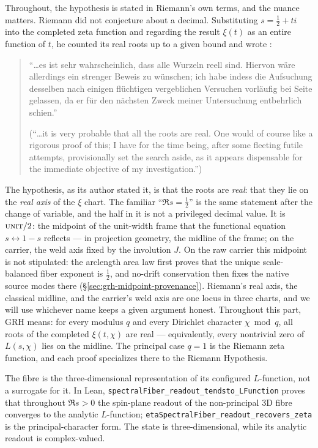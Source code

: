 Throughout, the hypothesis is stated in Riemann's own terms, and the nuance
matters. Riemann did not conjecture about a decimal. Substituting
\(s=\tfrac12+ti\) into the completed zeta function and regarding the result
\(\xi(t)\) as an entire function of \(t\), he counted its real roots up to a
given bound and wrote \cite{Riemann1859}:
\begin{quote}
``\ldots es ist sehr wahrscheinlich, dass alle Wurzeln reell sind. Hiervon
w\"are allerdings ein strenger Beweis zu w\"unschen; ich habe indess die
Aufsuchung desselben nach einigen fl\"uchtigen vergeblichen Versuchen
vorl\"aufig bei Seite gelassen, da er f\"ur den n\"achsten Zweck meiner
Untersuchung entbehrlich schien.''

(``\ldots it is very probable that all the roots are real. One would of
course like a rigorous proof of this; I have for the time being, after some
fleeting futile attempts, provisionally set the search aside, as it appears
dispensable for the immediate objective of my investigation.'')
\end{quote}
The hypothesis, as its author stated it, is that the roots are \emph{real}:
that they lie on the \emph{real axis} of the \(\xi\) chart. The familiar
``\(\Re s=\tfrac12\)'' is the same statement after the change of variable,
and the half in it is not a privileged decimal value. It is
\(\textsc{unit}/2\): the midpoint of the unit-width frame that the functional
equation \(s\leftrightarrow1-s\) reflects --- in projection geometry, the
midline of the frame; on the carrier, the weld axis fixed by the involution
\(J\).  On the raw carrier this midpoint is not stipulated: the arclength
area law first proves that the unique scale-balanced fiber exponent is
\(\tfrac12\), and no-drift conservation then fixes the native source modes
there (\S\ref{sec:grh-midpoint-provenance}). Riemann's real axis, the
classical midline, and the carrier's weld
axis are one locus in three charts, and we will use whichever name keeps a
given argument honest. Throughout this part, GRH means: for every modulus
\(q\) and every Dirichlet character \(\chi\bmod q\), all roots of the
completed \(\xi(t,\chi)\) are real --- equivalently, every nontrivial zero of
\(L(s,\chi)\) lies on the midline. The principal case \(q=1\) is the Riemann
zeta function, and each proof specializes there to the Riemann Hypothesis.

The fibre is the three-dimensional representation of its configured
$L$-function, not a surrogate for it.  In Lean,
\texttt{spectralFiber\_readout\_tendsto\_LFunction} proves that throughout
$\Re s>0$ the spin-plane readout of the non-principal 3D fibre converges to
the analytic $L$-function; \texttt{etaSpectralFiber\_readout\_recovers\_zeta}
is the principal-character form.  The state is three-dimensional, while its
analytic readout is complex-valued.


